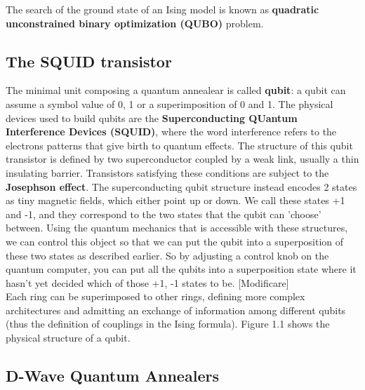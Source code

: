 The search of the ground state of an Ising model is known as \textbf{quadratic unconstrained binary optimization (QUBO)} problem. \\

\subsection{The SQUID transistor}

 The minimal unit composing a quantum annealear is called \textbf{qubit}: a qubit can assume a symbol value of 0, 1 or a superimposition of 0 and 1. The physical devices used to build qubits are the \textbf{Superconducting QUantum Interference Devices (SQUID)}, where the word interference refers to the electrons patterns that give birth to quantum effects. The structure of this qubit transistor is defined by two superconductor coupled by a weak link, usually a thin insulating barrier. Transistors satisfying these conditions are subject to the \textbf{Josephson effect}. The superconducting qubit structure instead encodes 2 states as tiny magnetic fields, which either point up or down. We call these states +1 and -1, and they correspond to the two states that the qubit can 'choose' between. Using the quantum mechanics that is accessible with these structures, we can control this object so that we can put the qubit into a superposition of these two states as described earlier. So by adjusting a control knob on the quantum computer, you can put all the qubits into a superposition state where it hasn't yet decided which of those +1, -1 states to be. [Modificare]\\
  Each ring can be superimposed to other rings, defining more complex architectures and admitting an exchange of information among different qubits (thus the definition of couplings in the Ising formula). Figure 1.1 shows the physical structure of a qubit.\\

\subsection{D-Wave Quantum Annealers}

